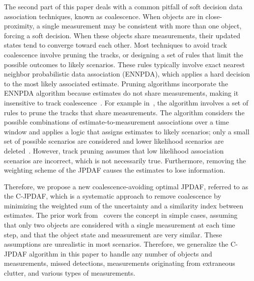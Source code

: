 
The second part of this paper deals with a common pitfall of soft decision data association techniques, known as coalescence.
When objects are in close-proximity, a single measurement may be consistent with more than one object, forcing a soft decision.
When these objects share measurements, their updated states tend to converge toward each other.
Most techniques to avoid track coalescence involve pruning the tracks, or designing a set of rules that limit the possible outcomes to likely scenarios. These rules typically involve exact nearest neighbor probabilistic data association (ENNPDA), which applies a hard decision to the most likely associated estimate. Pruning algorithms incorporate the ENNPDA algorithm because estimates do not share measurements, making it insensitive to track coalescence~\cite{Coal1}.
For example in~\cite{Fitzgerald}, the algorithm involves a set of rules to prune the tracks that share measurements.
The algorithm considers the possible combinations of estimate-to-measurement associations over a time window and applies a logic that assigns estimates to likely scenarios; only a small set of possible scenarios are considered and lower likelihood scenarios are deleted~\cite{Coal_d,Coal_e,Coal_c}.
However, track pruning assumes that low likelihood association scenarios are incorrect, which is not necessarily true.
Furthermore, removing the weighting scheme of the JPDAF causes the estimates to lose information.

Therefore, we propose a new coalescence-avoiding optimal JPDAF, referred to as the C-JPDAF, which is a systematic approach to remove coalescence by minimizing the weighted sum of the uncertainty and a similarity index between estimates. The prior work from~\cite{KauLovLee14} covers the concept in simple cases, assuming that only two objects are considered with a single measurement at each time step, and that the object state and measurement are very similar. These assumptions are unrealistic in most scenarios.
Therefore, we generalize the C-JPDAF algorithm in this paper to handle any number of objects and measurements, missed detections, measurements originating from extraneous clutter, and various types of measurements.


